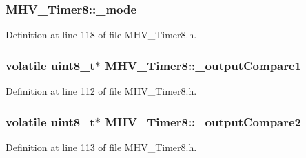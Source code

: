 \hypertarget{class_m_h_v___timer8_a6f6b063d32d0778e8d1a91c561c79f13}{
\subsubsection[{\-\_\-mode}]{ {\bf \-M\-H\-V\-\_\-\-Timer8\-::\-\_\-mode}}}
\label{class_m_h_v___timer8_a6f6b063d32d0778e8d1a91c561c79f13}


\-Definition at line 118 of file \-M\-H\-V\-\_\-\-Timer8.\-h.

\hypertarget{class_m_h_v___timer8_ab69320fb8fee00da797099aa633fdd92}{
\subsubsection[{\-\_\-output\-Compare1}]{\setlength{\rightskip}{0pt plus 5cm}volatile uint8\-\_\-t$\ast$ {\bf \-M\-H\-V\-\_\-\-Timer8\-::\-\_\-output\-Compare1}}}
\label{class_m_h_v___timer8_ab69320fb8fee00da797099aa633fdd92}


\-Definition at line 112 of file \-M\-H\-V\-\_\-\-Timer8.\-h.

\hypertarget{class_m_h_v___timer8_a81be7741280c03ccfa31d22a20b5609b}{
\subsubsection[{\-\_\-output\-Compare2}]{\setlength{\rightskip}{0pt plus 5cm}volatile uint8\-\_\-t$\ast$ {\bf \-M\-H\-V\-\_\-\-Timer8\-::\-\_\-output\-Compare2}}}
\label{class_m_h_v___timer8_a81be7741280c03ccfa31d22a20b5609b}


\-Definition at line 113 of file \-M\-H\-V\-\_\-\-Timer8.\-h.


